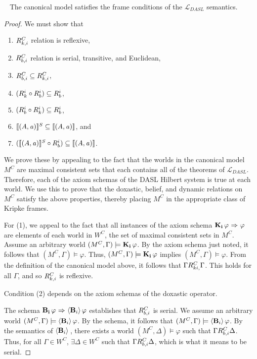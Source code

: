 \begin{lemma}[Canonicity]~\label{canon}
The canonical model satisfies the frame conditions of the $\mathcal{L}_{DASL}$ semantics.\\
\end{lemma}
\begin{proof}
	We must show that
	\begin{enumerate}
	\item $R_{k,i}^C$ relation is reflexive,
	\item $R_{b,i}^C$ relation is serial, transitive, and Euclidean,
	\item $R_{b,i}^C \subseteq R_{k,i}^C$,
	\item $(R_{k}^i \circ R_{b}^i) \subseteq R_{b}^i$, 
	\item $(R_{b}^i \circ R_{k}^i) \subseteq R_{b}^i$,
	\item $\llbracket (A,\mathit{a})\rrbracket^S \subseteq \llbracket (A,\mathit{a})\rrbracket$, and 	
	\item  $(\llbracket (A,\mathit{a})\rrbracket^S \circ R_{b}^i) \subseteq \llbracket (A,\mathit{a})\rrbracket$.
	\end{enumerate}
	
	We prove these by appealing to the fact that the worlds in the canonical model $M^C$ are maximal consistent sets that each contains all of the theorems of $\mathcal{L}_{DASL}$. Therefore, each of the axiom schemas of the DASL Hilbert system is true at each world. We use this to prove that the doxastic, belief, and dynamic relations on $M^C$ satisfy the above properties, thereby placing $M^C$ in the appropriate class of Kripke frames.
	
	For (1), we appeal to the fact that all instances of the axiom schema $\mathbf{K}_{\mathbf{i}}\,\varphi {\ \Rightarrow \ } \varphi$ are elements of each world in $W^C$, the set of maximal consistent sets in $M^C$. Assume an arbitrary world $(M^C, \Gamma)\models \mathbf{K}_{\mathbf{i}}\,\varphi$. By the axiom schema just noted, it follows that $(M^C, \Gamma)\models \varphi$. Thus, $(M^C, \Gamma)\models\mathbf{K}_{\mathbf{i}}\,\varphi$ implies $(M^C, \Gamma)\models\varphi$. From the definition of the canonical model above, it follows that $\Gamma R_{ki,}^C\Gamma$. This holds for all $\Gamma$, and so $R_{k,i}^C$ is reflexive.
	
	Condition (2) depends on the axiom schemas of the doxastic operator. 
	
	The schema $\mathbf{B}_{\mathbf{i}}\,\varphi{\ \Rightarrow \ } \langle \mathbf{B}_{i} \rangle\,\varphi$ establishes that $R_{b,i}^C$ is serial. We assume an arbitrary world $(M^C, \Gamma)\models\langle \mathbf{B}_{i} \rangle\,\varphi$. By the schema, it follows that $(M^C,\Gamma)\models\langle \mathbf{B}_{i} \rangle\,\varphi$. By the semantics of $\langle \mathbf{B}_{i} \rangle\,$, there exists a world $(M^C,\Delta)\models\varphi$ such that $\Gamma R_{b,i}^C\Delta$. Thus, for all $\Gamma\in W^C$, $\exists \Delta \in W^C$ such that $\Gamma R_{b,i}^C\Delta$, which is what it means to be serial.
	

\end{proof}
